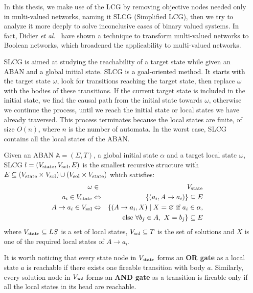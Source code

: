 In this thesis, we make use of the LCG by removing objective nodes needed only in multi-valued networks, naming it SLCG (Simplified LCG), then we try to analyze it more deeply to solve inconclusive cases of binary valued systems.
In fact, Didier \textit{et al.}~\cite{didier2011mapping} have shown a technique to transform multi-valued networks to Boolean networks, which broadened the applicability to multi-valued networks.

SLCG is aimed at studying the reachability of a target state while given an ABAN and a global initial state.
SLCG is a goal-oriented method.
It starts with the target state $\omega$, look for transitions reaching the target state, then replace $\omega$ with the bodies of these transitions.
If the current target state is included in the initial state, we find the causal path from the initial state towards $\omega$, otherwise we continue the process, until we reach the initial state or local states we have already traversed.
This process terminates because the local states are finite, of size $O(n)$, where $n$ is the number of automata.
In the worst case, SLCG contains all the local states of the ABAN.

\begin{definition}\label{defSLCG}
Given an ABAN $\mathbb{A} = (\Sigma,T)$, a global initial state $\alpha$ and a target local state $\omega$, SLCG $l= (V_{\mathrm{state}},V_{\mathrm{sol}},E)$ is the smallest recursive structure with $E \subseteq (V_{\mathrm{state}}\times V_{\mathrm{sol}})\cup (V_{\mathrm{sol}}\times V_{\mathrm{state}})$ which satisfies:
\begin{eqnarray*}
    \omega&\in& V_{\mathrm{state}} \\
    a_i\in V_{\mathrm{state}} &\Leftrightarrow& \{ (a_i, A\to a_i)\}\subseteq E \\
    A\to a_i\in V_{\mathrm{sol}}&\Leftrightarrow& \{ (A\to a_i,X)\mid X= \varnothing \text{ if } a_i\in \alpha,\\
    &&\text{else }\forall b_j\in A,\ X= b_j\}\subseteq E
\end{eqnarray*}
where $V_{\mathrm{state}}\subseteq LS$ is a set of local states, $V_{\mathrm{sol}}\subseteq T$ is the set of solutions and $X$ is one of the required local states of $A\to a_i$.
\end{definition}

It is worth noticing that every state node in $V_{\mathrm{state}}$ forms an \textbf{OR gate} as a local state $a$ is reachable if there exists one fireable transition with body $a$.
Similarly, every solution node in $V_{\mathrm{sol}}$ forms an \textbf{AND gate} as a transition is fireable only if all the local states in its head are reachable.

